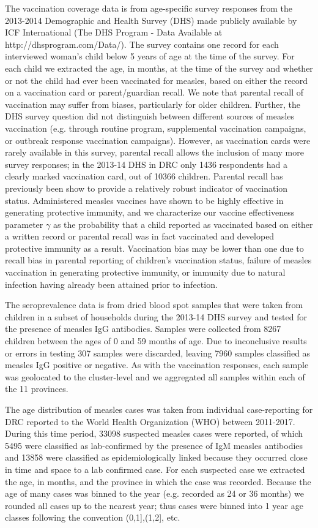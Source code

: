 \documentclass[nofootinbib,aps,pre,twocolumn,superscriptaddress,showkeys,showpacs]{revtex4-1}
\begin{document}
The vaccination coverage data is from age-specific survey responses from the 2013-2014 Demographic and Health Survey (DHS) made publicly available by ICF International (The DHS Program - Data Available at http://dhsprogram.com/Data/). The survey contains one record for each interviewed woman's child below 5 years of age at the time of the survey.   For each child we extracted the age, in months, at the time of the survey and whether or not the child had ever been vaccinated for measles, based on either the record on a vaccination card or parent/guardian recall. We note that parental recall of vaccination may suffer from biases, particularly for older children. Further, the DHS survey question did not distinguish between different sources of measles vaccination (e.g. through routine program, supplemental vaccination campaigns, or outbreak response vaccination campaigns).  However, as vaccination cards were rarely available in this survey, parental recall allows the inclusion of many more survey responses; in the 2013-14 DHS in DRC only 1436 respondents had a clearly marked vaccination card, out of 10366 children. Parental recall has previously been show to provide a relatively robust indicator of vaccination status\cite{ndirangu_validating_2011}. Administered measles vaccines have shown to be highly effective in generating protective immunity\cite{guris_measles_1996,king_clinical_1991}, and we characterize our vaccine effectiveness parameter $\gamma$ as the probability that a child reported as vaccinated based on either a written record or parental recall was in fact vaccinated and developed protective immunity as a result. Vaccination bias may be lower than one due to recall bias in parental reporting of children's vaccination status, failure of measles vaccination in generating protective immunity, or immunity due to natural infection having already been attained prior to infection.

The seroprevalence data is from dried blood spot samples that were taken from children in a subset of households during the 2013-14 DHS survey and tested for the presence of measles IgG antibodies.  Samples were collected from 8267 children between the ages of 0 and 59 months of age. Due to inconclusive results or errors in testing 307 samples were discarded, leaving 7960 samples classified as measles IgG positive or negative. As with the vaccination responses, each sample was geolocated to the cluster-level and we aggregated all samples within each of the 11 provinces.

The age distribution of measles cases was taken from individual case-reporting for DRC reported to the World Health Organization (WHO) between 2011-2017. During this time period, 33098 suspected measles cases were reported, of which 5495 were classified as lab-confirmed by the presence of IgM measles antibodies and 13858 were classified  as epidemiologically linked because they occurred close in time and space to a lab confirmed case.  For each suspected case we extracted the age, in months, and the province in which the case was recorded. Because the age of many cases was binned to the year (e.g. recorded as 24 or 36 months) we rounded all cases up to the nearest year; thus cases were binned into 1 year age classes following the convention (0,1],(1,2], etc. 
\end{document}
